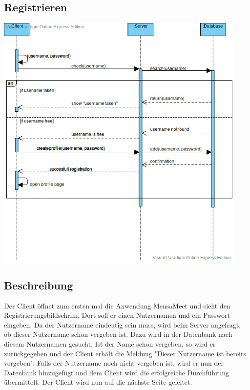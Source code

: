 \documentclass[a4paper]{scrreprt}
\begin{document}
\subsection{Registrieren}
\begin{center}
	\includegraphics[width=0.93\textwidth]{Sequenzdiagramme/SequenzdiagramRegistration.jpg}
\end{center}
\subsection*{Beschreibung}
Der Client öffnet zum ersten mal die Anwendung MensaMeet und sieht den Registrierungsbildschrim. Dort soll er einen Nutzernamen und ein Passwort eingeben. Da der Nutzername eindeutig sein muss, wird beim Server angefragt, ob dieser Nutzername schon vergeben ist. Dazu wird in der Datenbank nach diesem Nutzernamen gesucht. Ist der Name schon vergeben, so wird er zurückgegeben und der Client erhält die Meldung "Dieser Nutzername ist bereits vergeben".
Falls der Nutzername noch nicht vergeben ist, wird er nun der Datenbank hinzugefügt und dem Client wird die erfolgreiche Durchführung übermittelt. Der Client wird nun auf die nächste Seite geleitet.
\newpage
\end{document}
